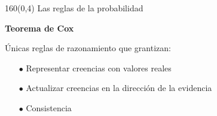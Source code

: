 \documentclass[shownotes,aspectratio=169]{beamer}
\begin{document}
 \begin{frame}[plain]
 \begin{textblock}{160}(0,4)
  \centering \LARGE Las reglas de la probabilidad
 \end{textblock}
 
 
\vspace{1.2cm}
 
  \textbf{Teorema de Cox} \\ 
  
  \vspace{0.3cm}
  
  \'Unicas reglas de razonamiento que grantizan:
\begin{itemize}
 \item[$\bullet$] Representar creencias con valores reales 
 \item[$\bullet$] Actualizar creencias en la direcci\'on de la evidencia
 \item[$\bullet$] Consistencia
 \end{itemize}
 
 
%  
 \end{frame}
\end{document}

